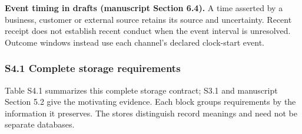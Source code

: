 \documentclass[
  11pt,
]{article}
\begin{document}
\textbf{Event timing in drafts (manuscript Section 6.4).} A time
asserted by a business, customer or external source retains its source
and uncertainty. Recent receipt does not establish recent conduct when
the event interval is unresolved. Outcome windows instead use each
channel's declared clock-start event.

\hypertarget{s41-complete-storage-requirements}{%
\subsubsection{S4.1 Complete storage
requirements}\label{s41-complete-storage-requirements}}

Table S4.1 summarizes this complete storage contract; S3.1 and
manuscript Section 5.2 give the motivating evidence. Each block groups
requirements by the information it preserves. The stores distinguish
record meanings and need not be separate databases.
\end{document}
